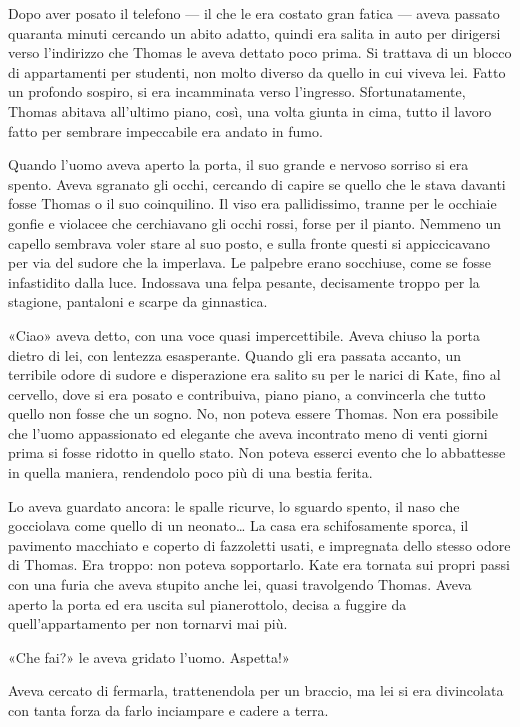 \documentclass[a4paper,oneside,11pt]{memoir}
\begin{document}
Dopo aver posato il telefono --- il che le era costato gran fatica --- aveva
passato quaranta minuti cercando un abito adatto, quindi era salita in auto per
dirigersi verso l'indirizzo che Thomas le aveva dettato poco prima. Si trattava
di un blocco di appartamenti per studenti, non molto diverso da quello in cui
viveva lei. Fatto un profondo sospiro, si era incamminata verso l'ingresso.
Sfortunatamente, Thomas abitava all'ultimo piano, così, una volta giunta in
cima, tutto il lavoro fatto per sembrare impeccabile era andato in fumo.

Quando l'uomo aveva aperto la porta, il suo grande e nervoso sorriso si era
spento. Aveva sgranato gli occhi, cercando di capire se quello che le stava
davanti fosse Thomas o il suo coinquilino. Il viso era pallidissimo, tranne per
le occhiaie gonfie e violacee che cerchiavano gli occhi rossi, forse per il
pianto. Nemmeno un capello sembrava voler stare al suo posto, e sulla fronte
questi si appiccicavano per via del sudore che la imperlava. Le palpebre erano
socchiuse, come se fosse infastidito dalla luce. Indossava una felpa pesante,
decisamente troppo per la stagione, pantaloni e scarpe da ginnastica.

«Ciao» aveva detto, con una voce quasi impercettibile. Aveva chiuso la porta
dietro di lei, con lentezza esasperante. Quando gli era passata accanto, un
terribile odore di sudore e disperazione era salito su per le narici di Kate,
fino al cervello, dove si era posato e contribuiva, piano piano, a convincerla
che tutto quello non fosse che un sogno. No, non poteva essere Thomas. Non era
possibile che l'uomo appassionato ed elegante che aveva incontrato meno di venti
giorni prima si fosse ridotto in quello stato. Non poteva esserci evento che lo
abbattesse in quella maniera, rendendolo poco più di una bestia ferita.

Lo aveva guardato ancora: le spalle ricurve, lo sguardo spento, il naso che
gocciolava come quello di un neonato\dots{} La casa era schifosamente sporca, il
pavimento macchiato e coperto di fazzoletti usati, e impregnata dello stesso
odore di Thomas. Era troppo: non poteva sopportarlo. Kate era tornata sui propri
passi con una furia che aveva stupito anche lei, quasi travolgendo Thomas. Aveva
aperto la porta ed era uscita sul pianerottolo, decisa a fuggire da
quell'appartamento per non tornarvi mai più.

«Che fai?» le aveva gridato l'uomo. Aspetta!»

Aveva cercato di fermarla, trattenendola per un braccio, ma lei si era
divincolata con tanta forza da farlo inciampare e cadere a terra.
\end{document}
